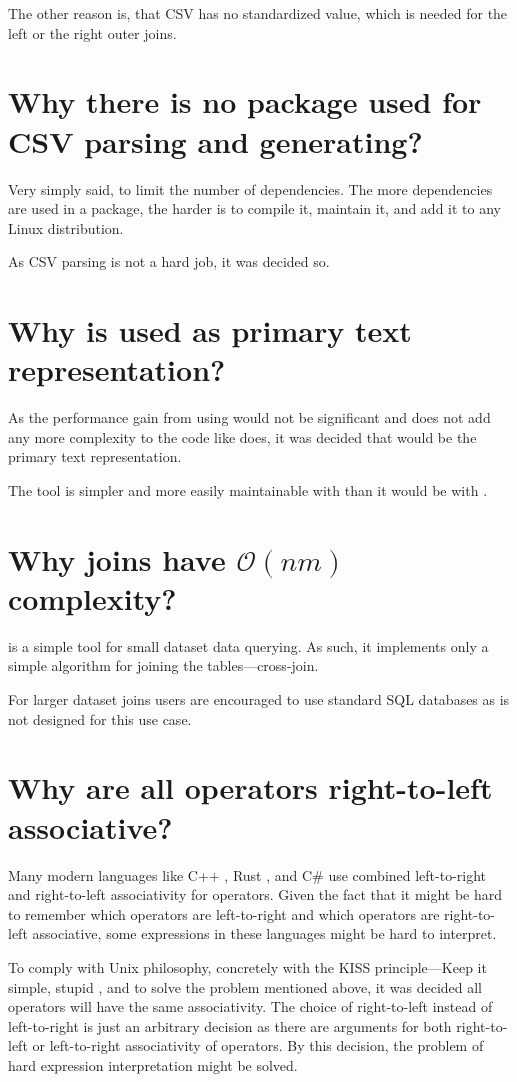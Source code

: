 The other reason is, that CSV has no standardized  value, which is needed for the left or the right outer joins.

\section{Why there is no package used for CSV parsing and generating?}
Very simply said, to limit the number of dependencies. The more dependencies are used in a package, the harder is to compile it, maintain it, and add it to any Linux distribution.

As CSV parsing is not a hard job, it was decided so.

\section{Why  is used as primary text representation?}
As the performance gain from using  would not be significant and  does not add any more complexity to the code like  does, 
it was decided that  would be the primary text representation.

The tool is simpler and more easily maintainable with  than it would be with .

\section{Why joins have $\mathcal{O}(nm)$ complexity?}
 is a simple tool for small dataset data querying. As such, it implements only a simple algorithm for joining the tables---cross-join.

For larger dataset joins users are encouraged to use standard SQL databases as  is not designed for this use case.

\section{Why are all operators right-to-left associative?}
Many modern languages like C++ \cite{cpp-associativity-manual}, Rust \cite{rust-expressions}, and C\# \cite{csharp-expressions} use combined left-to-right and right-to-left associativity for operators.
Given the fact that it might be hard to remember which operators are left-to-right and which operators are right-to-left associative, some expressions in these languages might be hard to interpret.

To comply with Unix philosophy, concretely with the KISS principle---Keep it simple, stupid \cite{enwiki-kiss}, and to solve the problem mentioned above, it was decided all operators will have the same associativity.
The choice of right-to-left instead of left-to-right is just an arbitrary decision as there are arguments for both right-to-left or left-to-right associativity of operators.
By this decision, the problem of hard expression interpretation might be solved.
